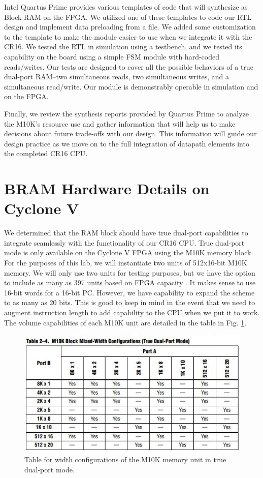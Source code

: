 \documentclass[conference]{IEEEtran}
\begin{document}
Intel Quartus Prime provides various templates of code that will synthesize as Block RAM on the FPGA. We utilized one of these templates to code our RTL design and implement data preloading from a file. We added some customization to the template to make the module easier to use when we integrate it with the CR16. We tested the RTL in simulation using a testbench, and we tested its capability on the board using a simple FSM module with hard-coded reads/writes. Our tests are designed to cover all the possible behaviors of a true dual-port RAM--two simultaneous reads, two simultaneous writes, and a simultaneous read/write. Our module is demonstrably operable in simulation and on the FPGA.

Finally, we review the synthesis reports provided by Quartus Prime to analyze the M10K's resource use and gather information that will help us to make decisions about future trade-offs with our design. This information will guide our design practice as we move on to the full integration of datapath elements into the completed CR16 CPU.

\section{BRAM Hardware Details on Cyclone V}
 We determined that the RAM block should have true dual-port capabilities to integrate seamlessly with the functionality of our CR16 CPU. True dual-port mode is only available on the Cyclone V FPGA using the M10K memory block. For the purposes of this lab, we will instantiate two units of 512x16-bit M10K memory. We will only use two units for testing purposes, but we have the option to include as many as 397 units based on FPGA capacity \cite{handbook}. It makes sense to use 16-bit words for a 16-bit PC. However, we have capability to expand the scheme to as many as 20 bits. This is good to keep in mind in the event that we need to augment instruction length to add capability to the CPU when we put it to work. The volume capabilities of each M10K unit are detailed in the table in Fig. \ref{figure:m10k_table}.

 \begin{figure}[h]
     \centering
     \includegraphics[scale=0.65]{resources/figures/bram_table_a.png}
     \caption{Table for width configurations of the M10K memory unit in true dual-port mode. \cite{handbook}}
     \label{figure:m10k_table}
 \end{figure}
\end{document}
